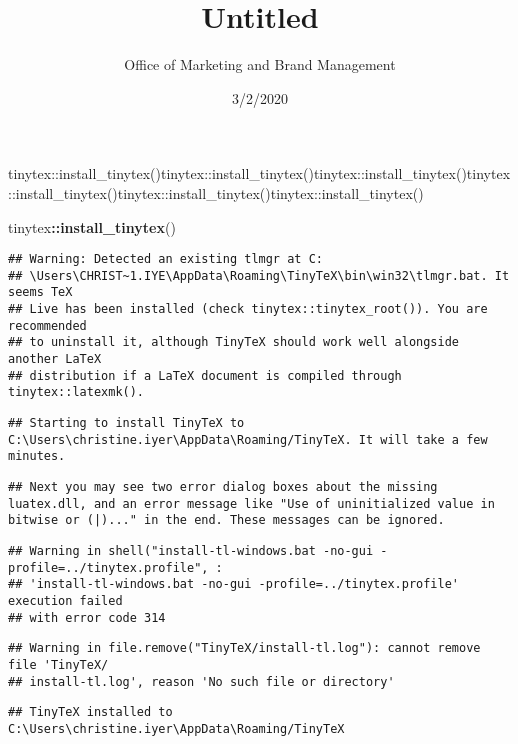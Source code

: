 \documentclass[
]{article}
\title{Untitled}
\author{Office of Marketing and Brand Management}
\date{3/2/2020}
\newenvironment{Shaded}{\begin{snugshade}}{\end{snugshade}}
\newcommand{\KeywordTok}[1]{\textcolor[rgb]{0.13,0.29,0.53}{\textbf{#1}}}
\newcommand{\NormalTok}[1]{#1}
\newcommand{\OperatorTok}[1]{\textcolor[rgb]{0.81,0.36,0.00}{\textbf{#1}}}
\begin{document}
\maketitle

tinytex::install\_tinytex()tinytex::install\_tinytex()tinytex::install\_tinytex()tinytex::install\_tinytex()tinytex::install\_tinytex()tinytex::install\_tinytex()

\begin{Shaded}
\begin{Highlighting}[]
\NormalTok{tinytex}\OperatorTok{::}\KeywordTok{install_tinytex}\NormalTok{()}
\end{Highlighting}
\end{Shaded}

\begin{verbatim}
## Warning: Detected an existing tlmgr at C:
## \Users\CHRIST~1.IYE\AppData\Roaming\TinyTeX\bin\win32\tlmgr.bat. It seems TeX
## Live has been installed (check tinytex::tinytex_root()). You are recommended
## to uninstall it, although TinyTeX should work well alongside another LaTeX
## distribution if a LaTeX document is compiled through tinytex::latexmk().
\end{verbatim}

\begin{verbatim}
## Starting to install TinyTeX to C:\Users\christine.iyer\AppData\Roaming/TinyTeX. It will take a few minutes.
\end{verbatim}

\begin{verbatim}
## Next you may see two error dialog boxes about the missing luatex.dll, and an error message like "Use of uninitialized value in bitwise or (|)..." in the end. These messages can be ignored.
\end{verbatim}

\begin{verbatim}
## Warning in shell("install-tl-windows.bat -no-gui -profile=../tinytex.profile", :
## 'install-tl-windows.bat -no-gui -profile=../tinytex.profile' execution failed
## with error code 314
\end{verbatim}

\begin{verbatim}
## Warning in file.remove("TinyTeX/install-tl.log"): cannot remove file 'TinyTeX/
## install-tl.log', reason 'No such file or directory'
\end{verbatim}

\begin{verbatim}
## TinyTeX installed to C:\Users\christine.iyer\AppData\Roaming/TinyTeX
\end{verbatim}
\end{document}
